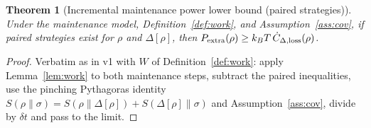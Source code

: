 \documentclass[11pt]{article}
\newtheorem{theorem}{Theorem}[section]
\theoremstyle{remark}
\begin{document}
\begin{theorem}[Incremental maintenance power lower bound (paired
strategies)]
\label{thm:power}
Under the maintenance model, Definition~\ref{def:work}, and
Assumption~\ref{ass:cov}, if paired strategies exist for $\rho$ and
$\Delta[\rho]$, then
$P_{\rm extra}(\rho) \ge k_B T\, \dot C_{\Delta,\rm loss}(\rho)$.
\end{theorem}
\begin{proof}
Verbatim as in v1 with $W$ of Definition~\ref{def:work}: apply
Lemma~\ref{lem:work} to both maintenance steps, subtract the paired
inequalities, use the pinching Pythagoras identity
$S(\rho\|\sigma) = S(\rho\|\Delta[\rho]) + S(\Delta[\rho]\|\sigma)$ and
Assumption~\ref{ass:cov}, divide by $\delta t$ and pass to the limit.
\end{proof}
\end{document}
